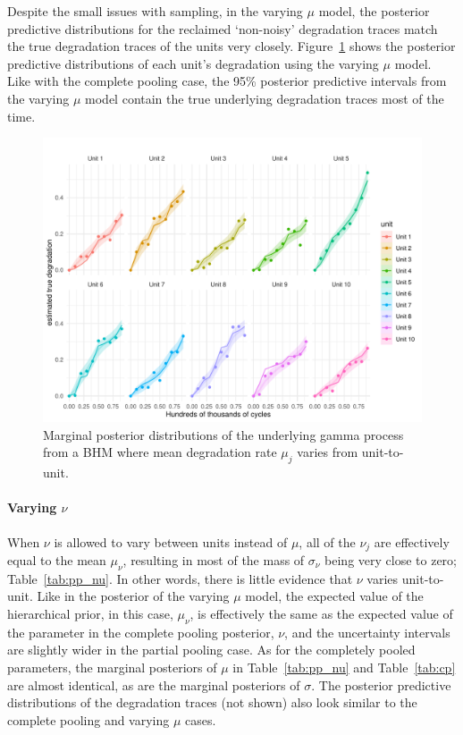 Despite the small issues with sampling, in the varying $\mu$ model, the posterior predictive distributions for the reclaimed `non-noisy' degradation traces match the true degradation traces of the units very closely. Figure~\ref{fig:pp_mu_filtered} shows the posterior predictive distributions of each unit's degradation using the varying $\mu$ model. Like with the complete pooling case, the 95\% posterior predictive intervals from the varying $\mu$ model contain the true underlying degradation traces most of the time.

\begin{figure}
   \centering
   \includegraphics[width=0.8\columnwidth]{./figures/ch-5/plot-pp-mu-filtered.pdf}
   \caption{Marginal posterior distributions of the underlying gamma process from a BHM where mean degradation rate $\mu_j$ varies from unit-to-unit.}
   \label{fig:pp_mu_filtered}
\end{figure}

\paragraph{Varying $\nu$} When $\nu$ is allowed to vary between units instead of $\mu$, all of the $\nu_j$ are effectively equal to the mean $\mu_\nu$, resulting in most of the mass of $\sigma_\nu$ being very close to zero; Table~\ref{tab:pp_nu}. In other words, there is little evidence that $\nu$ varies unit-to-unit. Like in the posterior of the varying $\mu$ model, the expected value of the hierarchical prior, in this case, $\mu_\nu$, is effectively the same as the expected value of the parameter in the complete pooling posterior, $\nu$, and the uncertainty intervals are slightly wider in the partial pooling case. As for the completely pooled parameters, the marginal posteriors of $\mu$ in Table~\ref{tab:pp_nu} and Table~\ref{tab:cp} are almost identical, as are the marginal posteriors of $\sigma$. The posterior predictive distributions of the degradation traces (not shown) also look similar to the complete pooling and varying $\mu$ cases.

